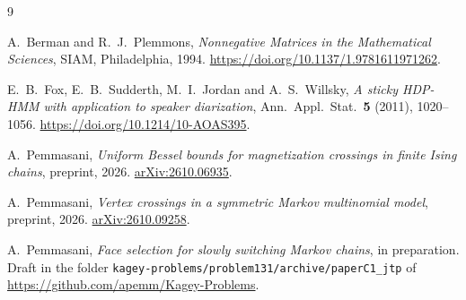 \documentclass[11pt]{article}
\theoremstyle{definition}
\theoremstyle{remark}
\begin{document}
\begin{thebibliography}{9}\small

A.~Berman and R.~J.~Plemmons, \emph{Nonnegative Matrices in the
Mathematical Sciences}, SIAM, Philadelphia, 1994.
\url{https://doi.org/10.1137/1.9781611971262}.

E.~B.~Fox, E.~B.~Sudderth, M.~I.~Jordan and A.~S.~Willsky, \emph{A sticky
HDP-HMM with application to speaker diarization}, Ann.~Appl.~Stat.~\textbf{5}
(2011), 1020--1056. \url{https://doi.org/10.1214/10-AOAS395}.

A.~Pemmasani, \emph{Uniform Bessel bounds for magnetization crossings in finite
Ising chains}, preprint, 2026.
\href{https://arxiv.org/abs/2610.06935}{arXiv:2610.06935}.

A.~Pemmasani, \emph{Vertex crossings in a symmetric Markov multinomial
model}, preprint, 2026.
\href{https://arxiv.org/abs/2610.09258}{arXiv:2610.09258}.

A.~Pemmasani, \emph{Face selection for slowly switching Markov chains}, in
preparation. Draft in the folder \nolinkurl{kagey-problems/problem131/archive/paperC1_jtp}
of \url{https://github.com/apemm/Kagey-Problems}.

\end{thebibliography}
\end{document}

